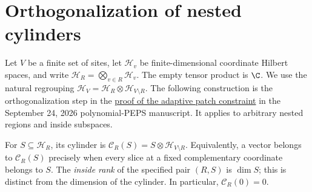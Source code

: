 \section{Orthogonalization of nested cylinders}
\label{sec:peps_nested_cylinder_orthogonalization}

Let $V$ be a finite set of sites, let $\mathcal H_v$ be finite-dimensional
coordinate Hilbert spaces, and write $\mathcal H_R=\bigotimes_{v\in R}\mathcal H_v$.
The empty tensor product is $\C$. We use the natural regrouping
$\mathcal H_V=\mathcal H_R\otimes\mathcal H_{V\setminus R}$.
The following construction is the orthogonalization step in the
\href{https://github.com/openai/math/blob/adc7f1241b42e322a6451854ab7e4b4c146bf78a/preprints/Polynomial-PEPS-approximation-of-gapped-square-grid-ground-states-September-24-2026/build/sections/03-patches.tex\#L565-L593}{proof of the adaptive patch constraint}
in the September 24, 2026 polynomial-PEPS manuscript. It applies to arbitrary
nested regions and inside subspaces.

\begin{definition}
    \label{def:peps_regional_cylinder}
    \leanok
    For $S\subseteq\mathcal H_R$, its cylinder is
    $\mathcal C_R(S)=S\otimes\mathcal H_{V\setminus R}$.
    Equivalently, a vector belongs to $\mathcal C_R(S)$ precisely when every
    slice at a fixed complementary coordinate belongs to $S$.
    The \emph{inside rank} of the specified pair $(R,S)$ is $\dim S$;
    this is distinct from the dimension of the cylinder. In particular, $\mathcal C_R(0)=0$.
\end{definition}

